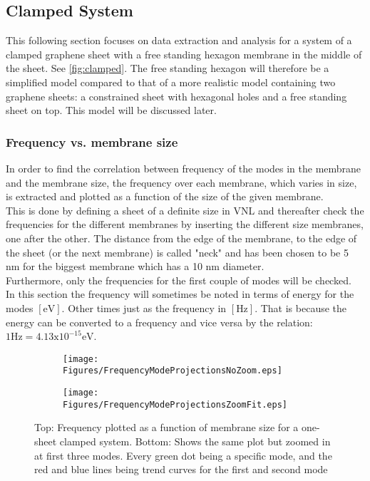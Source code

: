 
\subsection{Clamped System}
This following section focuses on data extraction and analysis for a system of a clamped graphene sheet with a free standing hexagon membrane in the middle of the sheet. See \cref{fig:clamped}. The free standing hexagon will therefore be a simplified model compared to that of a more realistic model containing two graphene sheets: a constrained sheet with hexagonal holes and a free standing sheet on top. This model will be discussed later.

\subsubsection{Frequency vs. membrane size}\label{Fvms}
In order to find the correlation between frequency of the modes in the membrane and the membrane size, the frequency over each membrane, which varies in size, is extracted and plotted as a function of the size of the given membrane. \\
This is done by defining a sheet of a definite size in VNL and thereafter check the frequencies for the different membranes by inserting the different size membranes, one after the other. The distance from the edge of the membrane, to the edge of the sheet (or the next membrane) is called "neck" and has been chosen to be 5 nm for the biggest membrane which has a 10 nm diameter. \\
Furthermore, only the frequencies for the first couple of modes will be checked. \\
In this section the frequency will sometimes be noted in terms of energy for the modes $[\text{eV}]$. Other times just as the frequency in $[\text{Hz}]$. That is because the energy can be converted to a frequency and vice versa by the relation: $1\text{Hz}=4.13\text{x}10^{-15}\text{eV}$.
\onecolumngrid

\begin{figure}[H]
\centering
\begin{subfigure}{\textwidth}
  \centering
  \vspace{-0.8em}
  \texttt{[image: Figures/FrequencyModeProjectionsNoZoom.eps]}
  \label{svfa}
  \vspace{-4.4em}
\end{subfigure}\vspace{1mm}
\begin{subfigure}{\textwidth}
  \centering
  \texttt{[image: Figures/FrequencyModeProjectionsZoomFit.eps]}
  \label{svfb}
\end{subfigure}
\vspace{-4em}
\caption{Top: Frequency plotted as a function of membrane size for a one-sheet clamped system. Bottom: Shows the same plot but zoomed in at first three modes. Every green dot being a specific mode, and the red and blue lines being trend curves for the first and second mode}
\label{sizevsfrequency}
\end{figure}
\twocolumngrid

